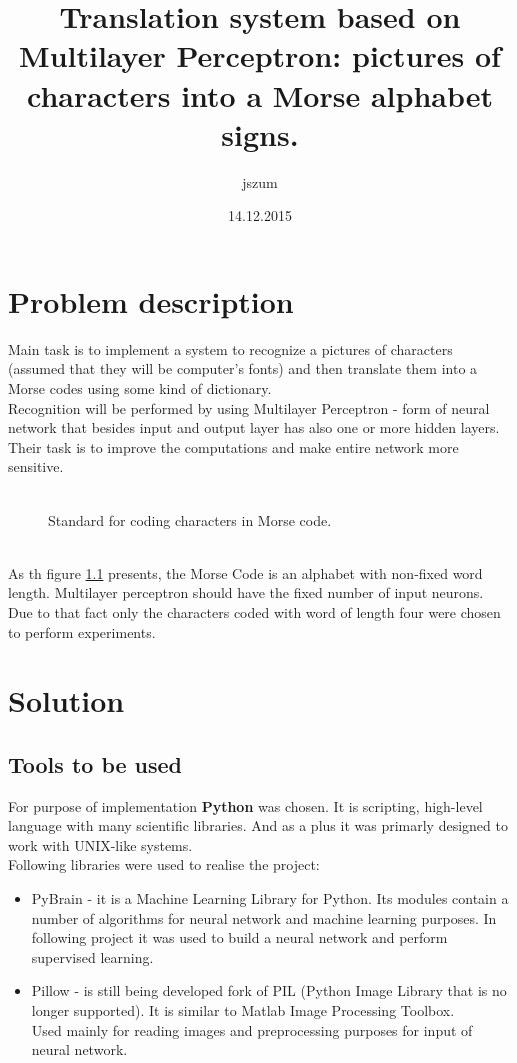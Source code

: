 \documentclass[eng,openany]{mgr}
\author{jszum}
\title{Translation system based on Multilayer Perceptron: pictures of characters into a Morse alphabet signs.}
\date{14.12.2015}
\begin{document}
\maketitle
\tableofcontents
\chapter{Problem description}

Main task is to implement a system to recognize a pictures of characters (assumed that they will be computer's fonts) and then translate them into a Morse codes using some kind of dictionary.\\
Recognition will be performed by using Multilayer Perceptron - form of neural network that besides input and output layer has also one or more hidden layers. Their task is to improve the computations and make entire network more sensitive.
\\\\
\begin{figure}[h]
\centering
\caption{Standard for coding characters in Morse code.}
\label{fig:morse}
\end{figure}
\\
As th figure \ref{fig:morse} presents, the Morse Code is an alphabet with non-fixed word length. Multilayer perceptron should have the fixed number of input neurons. Due to that fact only the characters coded with word of length four were chosen to perform experiments.
\chapter{Solution}
\section{Tools to be used}
For purpose of implementation \textbf{Python} was chosen. It is scripting, high-level language with many scientific libraries. And as a plus it was primarly designed to work with UNIX-like systems.\\
Following libraries were used to realise the project:
\begin{itemize}
\item PyBrain - it is a Machine Learning Library for Python. Its modules contain a number of algorithms for neural network and machine learning purposes. In following project it was used to build a neural network and perform supervised learning.
\item Pillow - is still being developed fork of PIL (Python Image Library that is no longer supported). It is similar to Matlab Image Processing Toolbox.\\
Used mainly for reading images and preprocessing purposes for input of neural network.
\end{itemize}
\end{document}
